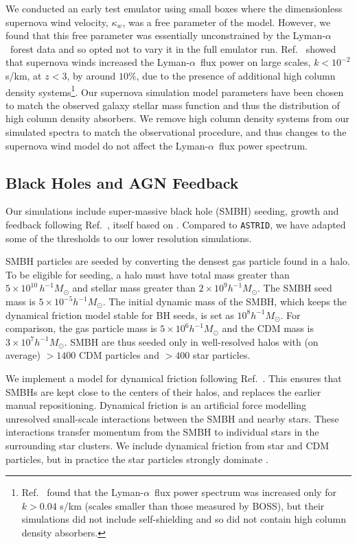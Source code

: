 \documentclass[a4paper,11pt]{article}
\newcommand{\Lya}{Lyman-$\alpha$}
\newcommand{\astrid}{\texttt{ASTRID}}
\begin{document}
We conducted an early test emulator using small boxes where the dimensionless supernova wind velocity, $\kappa_w$, was a free parameter of the model. However, we found that this free parameter was essentially unconstrained by the \Lya~forest data and so opted not to vary it in the full emulator run. Ref.~\cite{Bolton:2017} showed that supernova winds increased the \Lya~flux power on large scales, $k < 10^{-2}$ s/km, at $z < 3$, by around $10\%$, due to the presence of additional high column density systems\footnote{Ref.~\cite{Viel:2013} found that the \Lya~flux power spectrum was increased only for $ k > 0.04$ s/km (scales smaller than those measured by BOSS), but their simulations did not include self-shielding and so did not contain high column density absorbers.}. Our supernova simulation model parameters have been chosen to match the observed galaxy stellar mass function and thus the distribution of high column density absorbers. We remove high column density systems from our simulated spectra to match the observational procedure, and thus changes to the supernova wind model do not affect the \Lya~flux power spectrum.

\subsection{Black Holes and AGN Feedback}
\label{sec:agn}

Our simulations include super-massive black hole (SMBH) seeding, growth and feedback following Ref.~\cite{Ni:2022}, itself based on \cite{Feng:2016,SDH2005,DSH2005}. Compared to \astrid, we have adapted some of the thresholds to our lower resolution simulations.

SMBH particles are seeded by converting the densest gas particle found in a halo. To be eligible for seeding, a halo must have total mass greater than $5\times 10^{10}\,h^{-1}M_\odot$ and stellar mass greater than $2 \times 10^9 h^{-1} M_\odot$. The SMBH seed mass is $5 \times 10^{-5} h^{-1} M_\odot$. The initial dynamic mass of the SMBH, which keeps the dynamical friction model stable for BH seeds, is set as $10^{8} h^{-1} M_\odot$. For comparison, the gas particle mass is $5 \times 10^6 h^{-1} M_\odot$ and the CDM mass is $ 3 \times 10^7 h^{-1} M_\odot$. SMBH are thus seeded only in well-resolved halos with (on average) $> 1400$ CDM particles and $>400$ star particles.

We implement a model for dynamical friction following Ref.~\citep{Chen:2021}. This ensures that SMBHs are kept close to the centers of their halos, and replaces the earlier manual repositioning. Dynamical friction is an artificial force modelling unresolved small-scale interactions between the SMBH and nearby stars. These interactions transfer momentum from the SMBH to individual stars in the surrounding star clusters. We include dynamical friction from star and CDM particles, but in practice the star particles strongly dominate \cite{Chen:2021}.
\end{document}
